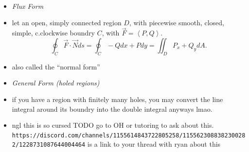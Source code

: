 \documentclass[11pt]{article}
\theoremstyle{definition}
\begin{document}
\begin{multicols}{2}
{\begin{itemize}
      \[ \text{Area}(D)=\iint_D1dA = \frac{1}{2}\oint_C -ydx+xdy\]
      \item[] \emph{Flux Form}
      \item let an open, simply connected region $D$, with piecewise smooth, closed, simple, c.clockwise boundry $C$, with $\vec{F} = \left<P,Q\right>$.
      \[\oint_C\vec{F}\cdot\vec{N}ds = \oint_C -Qdx+Pdy = \iint_D P_x+Q_y dA.\]
      \item also called the ``normal form''
      \item[] \emph{General Form (holed regions)}
      \item if you have a region with finitely many holes, you may convert the line integral around its boundry into the double integral anyways lmao.
      \item ngl this is so cursed TODO go to OH or tutoring to ask about this. \texttt{https://discord.com/channels/1155614843722805258/1155623088382300282/1228731087644004464} is a link to your thread with ryan about this
    \end{itemize}
  }
\end{multicols}
\end{document}
